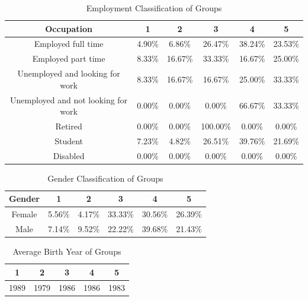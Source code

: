 \begin{table}[h!]
  \centering
  \caption{Employment Classification of Groups}
  \label{tab:emp_sensors}
  \begin{tabular}{cccccc}
    \toprule
     Occupation&1&2&3&4&5\\
    \midrule
Employed full time&4.90\%&6.86\%&26.47\%&38.24\%&23.53\%\\
Employed part time&8.33\%&16.67\%&33.33\%&16.67\%&25.00\%\\
Unemployed and looking for work&8.33\%&16.67\%&16.67\%&25.00\%&33.33\%\\
Unemployed and not looking for work&0.00\%&0.00\%&0.00\%&66.67\%&33.33\%\\
Retired&0.00\%&0.00\%&100.00\%&0.00\%&0.00\%\\
Student&7.23\%&4.82\%&26.51\%&39.76\%&21.69\%\\
Disabled&0.00\%&0.00\%&0.00\%&0.00\%&0.00\%\\
    \bottomrule
  \end{tabular}
\end{table}



\begin{table}[h!]
  \centering
  \caption{Gender Classification of Groups}
  \label{tab:gender_sensors}
  \begin{tabular}{cccccc}
    \toprule
     Gender&1&2&3&4&5 \\
    \midrule
Female&5.56\%&4.17\%&33.33\%&30.56\%&26.39\% \\
Male&7.14\%&9.52\%&22.22\%&39.68\%&21.43\% \\
    \bottomrule
  \end{tabular}
\end{table}



\begin{table}[h!]
  \centering
  \caption{Average Birth Year of Groups}
  \label{tab:year_sensors}
  \begin{tabular}{ccccc}
    \toprule
     1&2&3&4&5\\
    \midrule
	1989& 1979& 1986& 1986& 1983\\
    \bottomrule
  \end{tabular}
\end{table}


